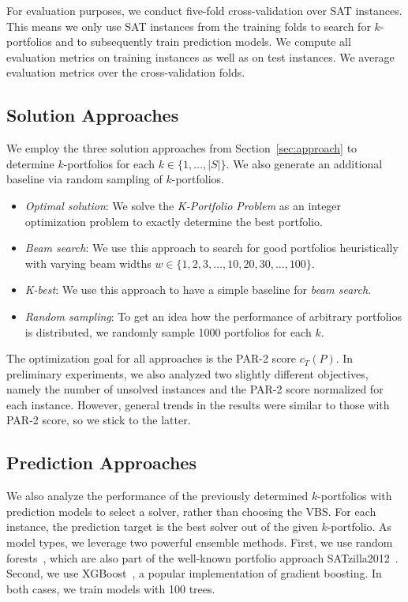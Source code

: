 \documentclass[runningheads]{llncs}
\begin{document}
For evaluation purposes, we conduct five-fold cross-validation over SAT instances.
This means we only use SAT instances from the training folds to search for $k$-portfolios and to subsequently train prediction models.
We compute all evaluation metrics on training instances as well as on test instances.
We average evaluation metrics over the cross-validation folds.

\subsection{Solution Approaches}

We employ the three solution approaches from Section~\ref{sec:approach} to determine $k$-portfolios for each $k \in \{1, \dots, |S|\}$. 
We also generate an additional baseline via random sampling of $k$-portfolios.

\begin{itemize}
	\item \emph{Optimal solution}:
	We solve the \emph{K-Portfolio Problem} as an integer optimization problem to exactly determine the best portfolio.
	\item \emph{Beam search}: 
	We use this approach to search for good portfolios heuristically with varying beam widths $w \in \{1, 2, 3, \dots, 10, 20, 30, \dots, 100\}$.
	\item \emph{K-best}:
	We use this approach to have a simple baseline for \emph{beam search}.
	\item \emph{Random sampling}:
	To get an idea how the performance of arbitrary portfolios is distributed, we randomly sample 1000 portfolios for each $k$.
\end{itemize}

The optimization goal for all approaches is the PAR-2 score $c_T(P)$.
In preliminary experiments, we also analyzed two slightly different objectives, namely the number of unsolved instances and the PAR-2 score normalized for each instance.
However, general trends in the results were similar to those with PAR-2 score, so we stick to the latter.

\subsection{Prediction Approaches}

We also analyze the performance of the previously determined $k$-portfolios with prediction models to select a solver, rather than choosing the VBS. 
For each instance, the prediction target is the best solver out of the given $k$-portfolio.
As model types, we leverage two powerful ensemble methods.
First, we use random forests~\cite{breiman2001random}, which are also part of the well-known portfolio approach SATzilla2012~\cite{xu2012satzilla2012}.
Second, we use XGBoost~\cite{xgboost}, a popular implementation of gradient boosting.
In both cases, we train models with 100 trees.
\end{document}
